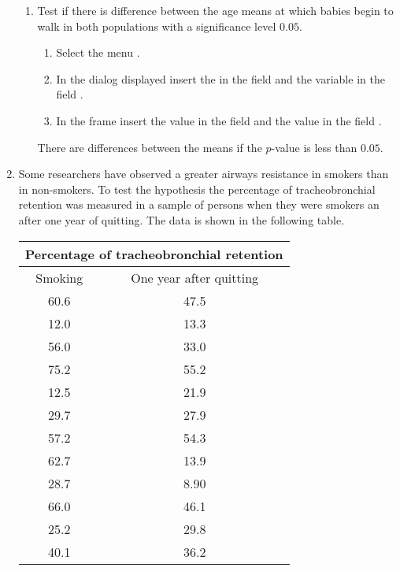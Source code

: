 \begin{enumerate}[leftmargin=*]
\begin{enumerate}
\item Test if there is difference between the age means at which babies begin to walk in both populations
with a significance level $0.05$.
\begin{indication}
\begin{enumerate}
\item Select the menu .
\item In the dialog displayed insert the  in the field  and the variable
 in the field .
\item In the frame  insert the value  in the field  and the
value  in the field .
\end{enumerate}
There are differences between the means if the $p$-value is less than $0.05$.
\end{indication}
\end{enumerate}


\item Some researchers have observed a greater airways resistance in smokers than in non-smokers.
To test the hypothesis the percentage of tracheobronchial retention was measured in a sample of persons when they were
smokers an after one year of quitting.
The data is shown in the following table.
\begin{center}
\begin{tabular}{cc}
\multicolumn{2}{c}{Percentage of tracheobronchial retention} \\
\toprule
Smoking & One year after quitting\\
60.6 & 47.5 \\
12.0 & 13.3 \\
56.0 & 33.0 \\
75.2 & 55.2 \\
12.5 & 21.9 \\
29.7 & 27.9 \\
57.2 & 54.3 \\
62.7 & 13.9 \\
28.7 & 8.90 \\
66.0 & 46.1 \\
25.2 & 29.8 \\
40.1 & 36.2 \\
\hline
\end{tabular}
\end{center}


\end{enumerate}
